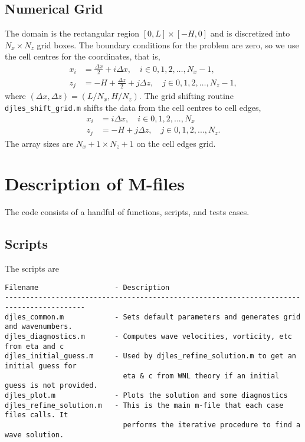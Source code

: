 \documentclass[letterpaper]{article}
\begin{document}
\subsection{Numerical Grid}
The domain is the rectangular region $[0,L] \times [-H,0]$ and is discretized into $N_x\times N_z$ grid boxes. The boundary conditions for the problem are zero, so we use the cell centres for the coordinates, that is,
\begin{align}
x_i &= \frac{\Delta x}{2}  + i \Delta x, \quad i \in 0,1,2,\hdots,N_x-1,\\
z_j &= -H + \frac{\Delta z}{2}  + j \Delta z, \quad j  \in 0,1,2,\hdots,N_z-1,
\end{align}
where $(\Delta x, \Delta z) = (L/N_x, H/N_z)$. The grid shifting routine \verb+djles_shift_grid.m+ shifts the data from the cell centres to cell edges, 
\begin{align}
x_i &= i \Delta x, \quad i \in 0,1,2,...,N_x\\
z_j &= -H + j \Delta z, \quad j  \in 0,1,2,...,N_z.
\end{align}
The array sizes are $N_x+1 \times N_z+1$ on the cell edges grid.

\section{Description of M-files}
The code consists of a handful of functions, scripts, and tests cases.

\subsection{Scripts}
The scripts are
\begin{verbatim}
Filename                  - Description
-----------------------------------------------------------------------------------------
djles_common.m            - Sets default parameters and generates grid and wavenumbers.
djles_diagnostics.m       - Computes wave velocities, vorticity, etc from eta and c
djles_initial_guess.m     - Used by djles_refine_solution.m to get an initial guess for
                            eta & c from WNL theory if an initial guess is not provided.
djles_plot.m              - Plots the solution and some diagnostics
djles_refine_solution.m   - This is the main m-file that each case files calls. It
                            performs the iterative procedure to find a wave solution.
\end{verbatim}
\end{document}
